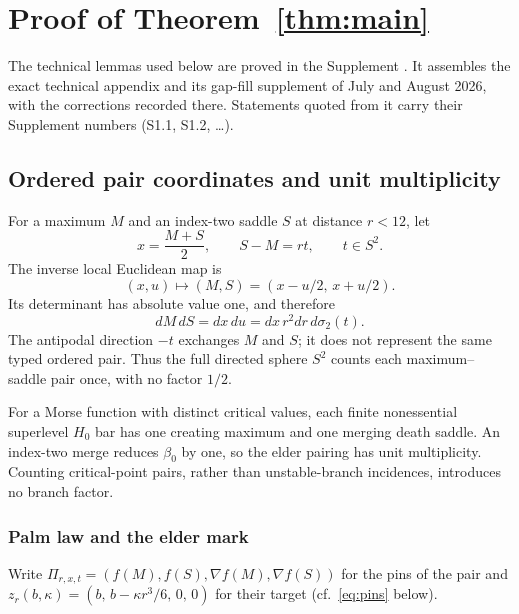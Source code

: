 \section{Proof of Theorem~\ref{thm:main}}\label{sec:proof}

The technical lemmas used below are proved in the Supplement . It assembles the exact technical appendix and its gap-fill supplement of July and August 2026, with the corrections recorded there. Statements quoted from it carry their Supplement numbers (S1.1, S1.2, \dots).

\subsection{Ordered pair coordinates and unit multiplicity}\label{ssec:pairs}

For a maximum $M$ and an index-two saddle $S$ at distance $r<12$, let
\begin{equation}\tag{3.1}
x=\frac{M+S}{2},\qquad S-M=rt,\qquad t\in S^2 .
\end{equation}
The inverse local Euclidean map is
\begin{equation}\tag{3.2}
(x,u)\longmapsto(M,S)=(x-u/2,\,x+u/2).
\end{equation}
Its determinant has absolute value one, and therefore
\begin{equation}\tag{3.3}\label{eq:dMdS}
dM\,dS=dx\,du=dx\,r^2dr\,d\sigma_2(t).
\end{equation}
The antipodal direction $-t$ exchanges $M$ and $S$; it does not represent the same typed ordered pair. Thus the full directed sphere $S^2$ counts each maximum--saddle pair once, with no factor $1/2$.

For a Morse function with distinct critical values, each finite nonessential superlevel $H_0$ bar has one creating maximum and one merging death saddle. An index-two merge reduces $\beta_0$ by one, so the elder pairing has unit multiplicity. Counting critical-point pairs, rather than unstable-branch incidences, introduces no branch factor.

\subsubsection*{Palm law and the elder mark}
Write $\Pi_{r,x,t}=(f(M),f(S),\nabla f(M),\nabla f(S))$ for the pins of the pair and $z_r(b,\kappa)=(b,\,b-\kappa r^3/6,\,0,\,0)$ for their target (cf.~\eqref{eq:pins} below).

